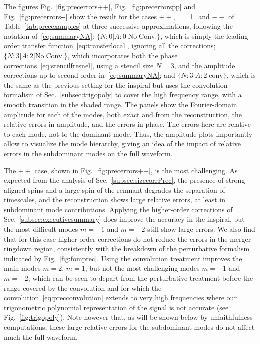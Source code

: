 \documentclass[aps,showpacs,twocolumn,
prd,superscriptaddress,nofootinbib]{revtex4-1}
\begin{document}
The figures Fig.~\ref{fig:precerrors++}, Fig.~\ref{fig:precerrorspp} and Fig.~\ref{fig:precerrors--} show the result for the cases $++$, $\perp\perp$ and $--$ of Table~\ref{tab:precexamples} at three successive approximations, following the notation of~\eqref{eq:summaryNA}: $\{N:0 | A:0 | \mathrm{No \; Conv.}\}$, which is simply the leading-order transfer function~\eqref{eq:transferlocal}, ignoring all the corrections; $\{N:3 | A:2 | \mathrm{No \; Conv.}\}$, which incorporates both the phase corrections~\eqref{eq:stencilfresnel}, using a stencil size $N=3$, and the amplitude corrections up to second order in~\eqref{eq:summaryNA}; and $\{N:3 | A:2 | \text{conv}\}$, which is the same as the previous setting for the inspiral but uses the convolution formalism of Sec.~\ref{subsec:trigopoly} to cover the high frequency range, with a smooth transition in the shaded range. The panels show the Fourier-domain amplitude for each of the modes, both exact and from the reconstruction, the relative errors in amplitude, and the errors in phase. The errors here are relative to each mode, not to the dominant mode. Thus, the amplitude plots importantly allow to visualize the mode hierarchy, giving an idea of the impact of relative errors in the subdominant modes on the full waveform.

The $++$ case, shown in Fig.~\ref{fig:precerrors++}, is the most challenging. As expected from the analysis of Sec.~\ref{subsec:sizecorrPrec}, the presence of strong aligned spins and a large spin of the remnant degrades the separation of timescales, and the reconstruction shows large relative errors, at least in subdominant mode contributions. Applying the higher-order corrections of Sec.~\ref{subsec:executivesummary} does improve the accuracy in the inspiral, but the most difficult modes $m=-1$ and $m=-2$ still show large errors. We also find that for this case higher-order corrections do not reduce the errors in the merger-ringdown region, consistently with the breakdown of the perturbative formalism indicated by Fig.~\ref{fig:fomprec}. Using the convolution treatment improves the main modes $m=2$, $m=1$, but not the most challenging modes $m=-1$ and $m=-2$, which can be seen to depart from the perturbative treatment before the range covered by the convolution and for which the convolution~\eqref{eq:precconvolution} extends to very high frequencies where our trigonometric polynomial representation of the signal is not accurate (see Fig.~\ref{fig:trigopoly}). Note however that, as will be shown below by unfaithfulness computations, these large relative errors for the subdominant modes do not affect much the full waveform.
\end{document}
